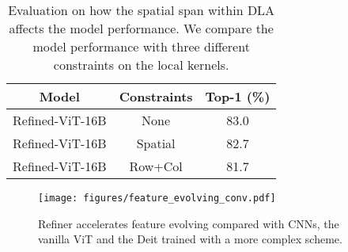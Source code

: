 \begin{table}[t]
\begin{minipage}[t]{0.42\linewidth}
    \begin{minipage}[b]{\linewidth}
    \caption{\small Evaluation on how the  spatial span within DLA  affects the model performance. We compare the model performance with three different constraints on the local  kernels. }
    \vspace{-8pt}
    \label{tab:spatial_span_effect}
    \footnotesize
    \setlength\tabcolsep{4pt}
    \begin{center}
    \begin{tabular}{ccc}  \toprule
    Model & Constraints       &  Top-1 (\%) \\ \midrule
    Refined-ViT-16B & None    &   83.0\\ 
    Refined-ViT-16B & Spatial  & 82.7\\ 
    Refined-ViT-16B & Row+Col & 81.7 \\ \bottomrule
    \end{tabular}
\end{center}
    \end{minipage}
    
\end{minipage}
\end{table}

\begin{wrapfigure}[18]{r}{0.5\textwidth}
    \centering
    \vspace{-4mm}
    \texttt{[image: figures/feature\_evolving\_conv.pdf]}
    \vspace{-4mm}
    \caption{\small Refiner accelerates feature evolving compared with CNNs, the vanilla ViT and the Deit trained with a more complex   scheme.}
    \label{fig:feat_evo_conv}
\end{wrapfigure}

\vspace{-2mm}
